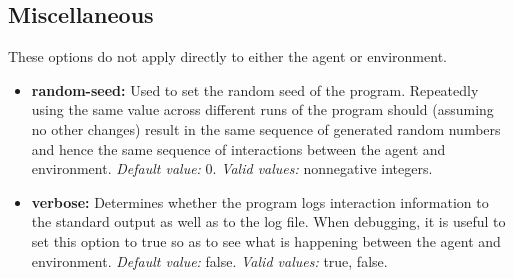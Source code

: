 \documentclass[a4paper,11pt]{article}
\begin{document}
\subsection{Miscellaneous}
These options do not apply directly to either the agent or environment.
\begin{itemize}
\item {\bf random-seed:} Used to set the random seed of the program. Repeatedly using the same value across different runs of the program should (assuming no other changes) result in the same sequence of generated random numbers and hence the same sequence of interactions between the agent and environment. {\em Default value:} 0. {\em Valid values:} nonnegative integers.

\item {\bf verbose:} Determines whether the program logs interaction information to the standard output as well as to the log file. When debugging, it is useful to set this option to true so as to see what is happening between the agent and environment. {\em Default value:} false. {\em Valid values:} true, false.
\end{itemize}
\end{document}
